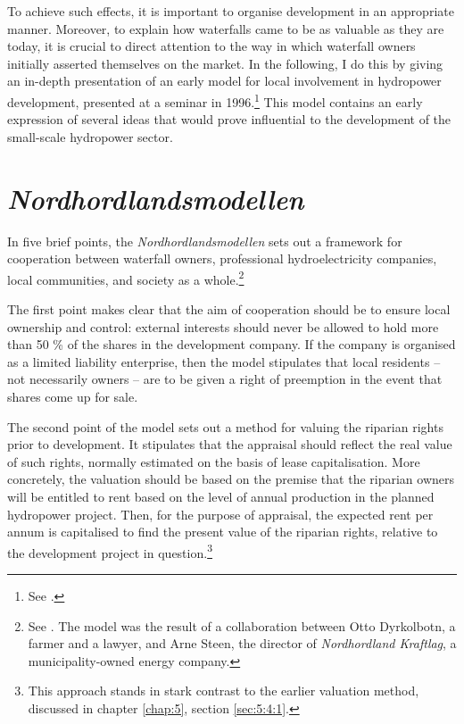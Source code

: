 To achieve such effects, it is important to organise development in an appropriate manner. Moreover, to explain how waterfalls came to be as valuable as they are today, it is crucial to direct attention to the way in which waterfall owners initially asserted themselves on the market. In the following, I do this by giving an in-depth presentation of an early model for local involvement in hydropower development, presented at a seminar in 1996.\footnote{See \cite{dyrkolbotn96}.} This model contains an early expression of several ideas that would prove influential to the development of the small-scale hydropower sector.


\section{{\it Nordhordlandsmodellen}}\label{sec:4:5}

In five brief points, the {\it Nordhordlandsmodellen} sets out a framework for cooperation between waterfall owners, professional hydroelectricity companies, local communities, and society as a whole.\footnote{See \cite{dyrkolbotn96}. The model was the result of a collaboration between Otto Dyrkolbotn, a farmer and a lawyer, and Arne Steen, the director of {\it Nordhordland Kraftlag}, a municipality-owned energy company.} 

The first point makes clear that the aim of cooperation should be to ensure local ownership and control: external interests should never be allowed to hold more than 50 \% of the shares in the development company. If the company is organised as a limited liability enterprise, then the model stipulates that local residents -- not necessarily owners -- are to be given a right of preemption in the event that shares come up for sale. %

The second point of the model sets out a method for valuing the riparian rights prior to development. It stipulates that the appraisal should reflect the real value of such rights, normally estimated on the basis of lease capitalisation. More concretely, the valuation should be based on the premise that the riparian owners will be entitled to rent based on the level of annual production in the planned hydropower project. Then, for the purpose of appraisal, the expected rent per annum is capitalised to find the present value of the riparian rights, relative to the development project in question.\footnote{This approach stands in stark contrast to the earlier valuation method, discussed in chapter \ref{chap:5}, section \ref{sec:5:4:1}.}

